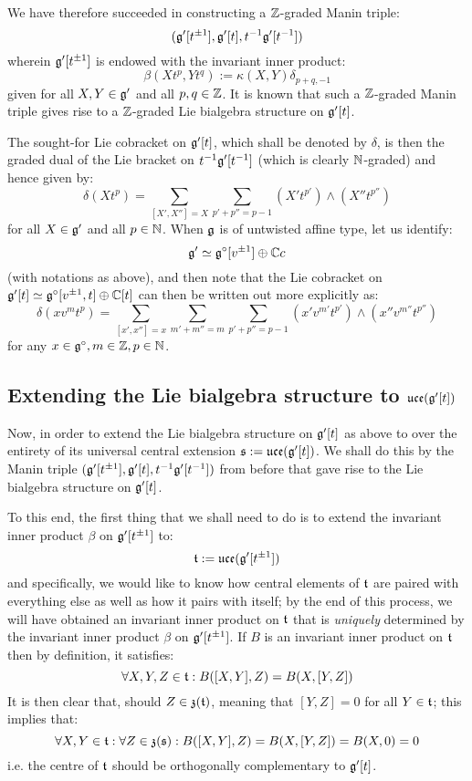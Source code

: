             We have therefore succeeded in constructing a $\mathbb{Z}$-graded Manin triple:
                $$(\mathfrak{g}'[t^{\pm 1}], \mathfrak{g}'[t], t^{-1}\mathfrak{g}'[t^{-1}])$$
            wherein $\mathfrak{g}'[t^{\pm 1}]$ is endowed with the invariant inner product:
                $$\beta(X t^p, Y t^q) := \kappa(X, Y) \delta_{p + q, -1}$$
            given for all $X, Y \in \mathfrak{g}'$ and all $p, q \in \mathbb{Z}$. It is known that such a $\mathbb{Z}$-graded Manin triple gives rise to a $\mathbb{Z}$-graded Lie bialgebra structure on $\mathfrak{g}'[t]$.
            
            The sought-for Lie cobracket on $\mathfrak{g}'[t]$, which shall be denoted by $\delta$, is then the graded dual of the Lie bracket on $t^{-1}\mathfrak{g}'[t^{-1}]$ (which is clearly $\mathbb{N}$-graded) and hence given by:
                $$\delta(X t^p) = \sum_{[X', X''] = X} \sum_{p' + p'' = p - 1} (X' t^{p'}) \wedge (X'' t^{p''})$$
            for all $X \in \mathfrak{g}'$ and all $p \in \mathbb{N}$. When $\mathfrak{g}$ is of untwisted affine type, let us identify:
                $$\mathfrak{g}' \simeq \mathfrak{g}^{\circ}[v^{\pm 1}] \oplus \mathbb{C} c$$
            (with notations as above), and then note that the Lie cobracket on $\mathfrak{g}'[t] \simeq \mathfrak{g}^{\circ}[v^{\pm 1}, t] \oplus \mathbb{C}[t]$ can then be written out more explicitly as:
                $$\delta(x v^m t^p) = \sum_{[x', x''] = x} \sum_{m' + m'' = m} \sum_{p' + p'' = p - 1} (x' v^{m'} t^{p'}) \wedge (x'' v^{m''} t^{p''})$$
            for any $x \in \mathfrak{g}^{\circ}, m \in \mathbb{Z}, p \in \mathbb{N}$.

        \subsection{Extending the Lie bialgebra structure to \texorpdfstring{$\mathfrak{uce}( \mathfrak{g}'[t] )$}{}}
            Now, in order to extend the Lie bialgebra structure on $\mathfrak{g}'[t]$ as above to over the entirety of its universal central extension $\mathfrak{s} := \mathfrak{uce}( \mathfrak{g}'[t] )$. We shall do this by  the Manin triple $(\mathfrak{g}'[t^{\pm 1}], \mathfrak{g}'[t], t^{-1}\mathfrak{g}'[t^{-1}])$ from before that gave rise to the Lie bialgebra structure on $\mathfrak{g}'[t]$.

            To this end, the first thing that we shall need to do is to extend the invariant inner product $\beta$ on $\mathfrak{g}'[t^{\pm 1}]$ to:
                $$\mathfrak{t} := \mathfrak{uce}( \mathfrak{g}'[t^{\pm 1}] )$$
            and specifically, we would like to know how central elements of $\mathfrak{t}$ are paired with everything else as well as how it pairs with itself; by the end of this process, we will have obtained an invariant inner product on $\mathfrak{t}$ that is \textit{uniquely} determined by the invariant inner product $\beta$ on $\mathfrak{g}'[t^{\pm 1}]$. If $B$ is an invariant inner product on $\mathfrak{t}$ then by definition, it satisfies:
                $$\forall X, Y, Z \in \mathfrak{t}: B([X, Y], Z) = B(X, [Y, Z])$$
            It is then clear that, should $Z \in \mathfrak{z}(\mathfrak{t})$, meaning that $[Y, Z] = 0$ for all $Y \in \mathfrak{t}$; this implies that:
                $$\forall X, Y \in \mathfrak{t}: \forall Z \in \mathfrak{z}(\mathfrak{s}): B([X, Y], Z) = B(X, [Y, Z]) = B(X, 0) = 0$$
            i.e. the centre of $\mathfrak{t}$ should be orthogonally complementary to $\mathfrak{g}'[t]$.
            
